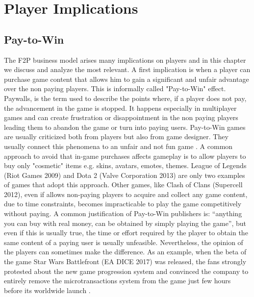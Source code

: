 \chapter{Player Implications}
\label{chap:background}
\section{Pay-to-Win}
The F2P business model arises many implications on players and in this chapter we discuss and analyze the most relevant.
A first implication is when a player can purchase game content that allows him to gain a significant and unfair advantage over the non paying players. This is informally called "Pay-to-Win" effect. Paywalls, is the term used to describe the points where, if a player does not pay, the advancement in the game is stopped. It happens especially in multiplayer games and can create frustration or disappointment in the non paying players leading them to abandon the game or turn into paying users. Pay-to-Win games are usually criticized both from players but also from game designer. They usually connect this phenomena to an unfair and not fun game \cite{alha_free--play_2014}. 
A common approach to avoid that in-game purchases affects gameplay is to allow players to buy only "cosmetic" items e.g. skins, avatars, emotes, themes. League of Legends (Riot Games 2009) and Dota 2 (Valve Corporation 2013) are only two examples of games that adopt this approach. Other games, like Clash of Clans (Supercell 2012), even if allows non-paying players to acquire and collect any game content, due to time constraints, becomes impracticable to play the game competitively without paying. A common justification of Pay-to-Win publishers is: “anything you can buy with real money, can be obtained by simply playing the game”, but even if this is usually true, the time or effort required by the player to obtain the same content of a paying user is usually unfeasible. Nevertheless, the opinion of the players can sometimes make the difference. As an example, when the beta of the game Star Wars Battlefront (EA DICE 2017) was released, the fans strongly protested about the new game progression system and convinced the company to entirely remove the microtransactions system from the game just few hours before its worldwide launch \cite{kain_ea_????, tassi_ea_????}.
